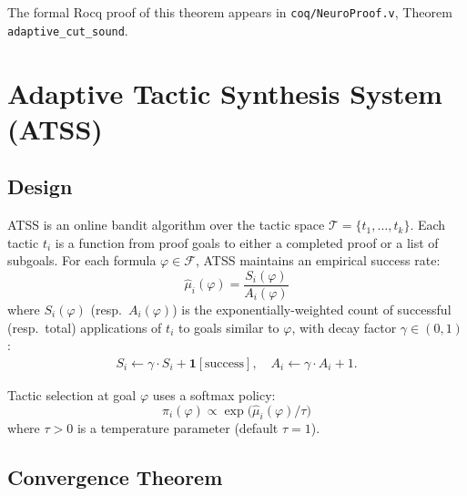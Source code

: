 \documentclass[conference]{IEEEtran}
\newcommand{\Fml}{\mathcal{F}}
\newcommand{\ATSS}{\textsc{ATSS}}
\begin{document}
\noindent The formal Rocq proof of this theorem appears in
\texttt{coq/NeuroProof.v}, Theorem \texttt{adaptive\_cut\_sound}.

\section{Adaptive Tactic Synthesis System (ATSS)}
\label{sec:atss}

\subsection{Design}

\ATSS{} is an online bandit algorithm over the tactic space
$\mathcal{T} = \{t_1, \ldots, t_k\}$.  Each tactic $t_i$ is a function from
proof goals to either a completed proof or a list of subgoals.  For each
formula $\varphi \in \Fml$, \ATSS{} maintains an empirical success rate:
\begin{equation}
  \hat{\mu}_i(\varphi) = \frac{S_i(\varphi)}{A_i(\varphi)}
\end{equation}
where $S_i(\varphi)$ (resp.\ $A_i(\varphi)$) is the exponentially-weighted
count of successful (resp.\ total) applications of $t_i$ to goals similar to
$\varphi$, with decay factor $\gamma \in (0,1)$:
\begin{align}
  S_i \leftarrow \gamma \cdot S_i + \mathbf{1}[\text{success}], \quad
  A_i \leftarrow \gamma \cdot A_i + 1.
\end{align}

Tactic selection at goal $\varphi$ uses a softmax policy:
\begin{equation}
  \label{eq:atss-policy}
  \pi_i(\varphi) \propto \exp\!\bigl(\hat{\mu}_i(\varphi) / \tau\bigr)
\end{equation}
where $\tau > 0$ is a temperature parameter (default $\tau = 1$).

\subsection{Convergence Theorem}
\end{document}
